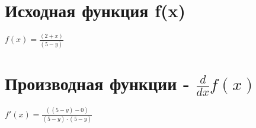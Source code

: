 \documentclass{article}
\begin{document}
\section*{Исходная функция f(x)}

$f(x) = \frac{(2 + x)}{(5 - y)}$

\section*{Производная функции - $\frac{d}{dx}f(x)$}

$f'(x) = \frac{((5 - y) - 0)}{(5 - y) \cdot (5 - y)}$
\end{document}

